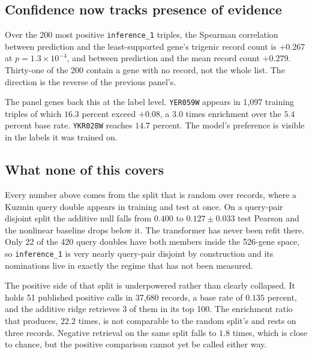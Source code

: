 \subsection{Confidence now tracks presence of evidence}

Over the 200 most positive \texttt{inference\_1} triples, the Spearman
correlation between prediction and the least-supported gene's trigenic record
count is $+0.267$ at $p = 1.3\times10^{-4}$, and between prediction and the mean
record count $+0.279$. Thirty-one of the 200 contain a gene with no record, not
the whole list. The direction is the reverse of the previous panel's.

The panel genes back this at the label level. \texttt{YER059W} appears in 1{,}097
training triples of which $16.3$ percent exceed $+0.08$, a $3.0$ times
enrichment over the $5.4$ percent base rate. \texttt{YKR028W} reaches $14.7$
percent. The model's preference is visible in the labels it was trained on.

\subsection{What none of this covers}

Every number above comes from the split that is random over records, where a
Kuzmin query double appears in training and test at once. On a query-pair
disjoint split the additive null falls from $0.400$ to $0.127 \pm 0.033$ test
Pearson and the nonlinear baseline drops below it. The transformer has never been
refit there. Only 22 of the 420 query doubles have both members inside the
526-gene space, so \texttt{inference\_1} is very nearly query-pair disjoint by
construction and its nominations live in exactly the regime that has not been
measured.

The positive side of that split is underpowered rather than clearly collapsed.
It holds 51 published positive calls in 37{,}680 records, a base rate of $0.135$
percent, and the additive ridge retrieves 3 of them in its top 100. The
enrichment ratio that produces, $22.2$ times, is not comparable to the random
split's and rests on three records. Negative retrieval on the same split falls to
$1.8$ times, which is close to chance, but the positive comparison cannot yet be
called either way.

